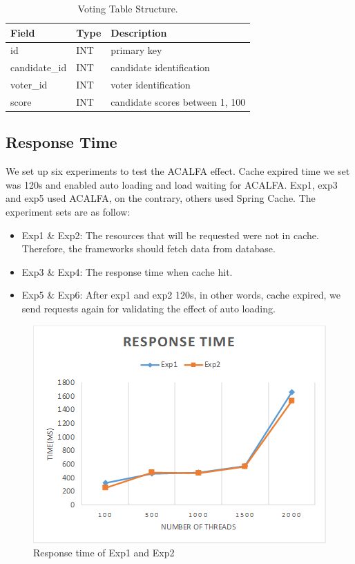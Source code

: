 \documentclass{singlecol-new}
\theoremstyle{TH}{
\newtheorem{lemma}{Lemma}
\newtheorem{theorem}[lemma]{Theorem}
\newtheorem{corrolary}[lemma]{Corrolary}
\newtheorem{conjecture}[lemma]{Conjecture}
\newtheorem{proposition}[lemma]{Proposition}
\newtheorem{claim}[lemma]{Claim}
\newtheorem{stheorem}[lemma]{Wrong Theorem}
}
\theoremstyle{THrm}{
\newtheorem{definition}{Definition}[section]
\newtheorem{question}{Question}[section]
\newtheorem{remark}{Remark}
\newtheorem{scheme}{Scheme}
}
\theoremstyle{THhit}{
\newtheorem{case}{Case}[section]
}
\begin{document}
\begin{table}[htb]
\begin{center}
 \caption{\label{VTS}Voting Table Structure.}
 \begin{tabular}{lll}
 \toprule
    Field & Type & Description\\
 \midrule
    id & INT & primary key\\
    candidate\_id & INT & candidate identification\\
    voter\_id & INT & voter identification\\
    score & INT & candidate scores between 1, 100\\
\bottomrule
 \end{tabular}
\end{center}
\end{table}

\subsection{Response Time}

We set up six experiments to test the ACALFA effect. Cache expired time we set was 120s and enabled auto loading and load waiting for ACALFA. Exp1, exp3 and exp5 used ACALFA, on the contrary, others used Spring Cache. The experiment sets are as follow:

\begin{itemize}
    \item Exp1 \& Exp2: The resources that will be requested were not in cache. Therefore, the frameworks should fetch data from database.
    \item Exp3 \& Exp4: The response time when cache hit.
    \item Exp5 \& Exp6: After exp1 and exp2 120s, in other words, cache expired, we send requests again for validating the effect of auto loading.
\end{itemize}

\begin{figure} [htb]
    \centering
    \includegraphics[width=1\linewidth]{img/exp1-2.png}
    \caption{Response time of Exp1 and Exp2}
    \label{exp1-2}
\end{figure}
\end{document}
